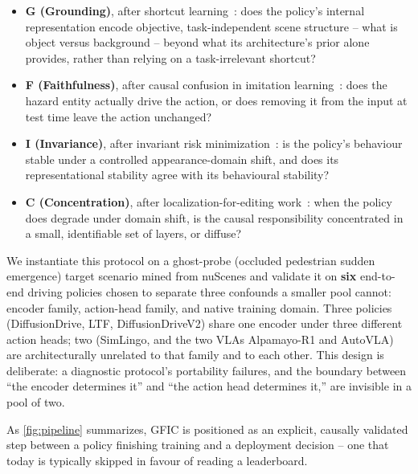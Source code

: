 \begin{itemize}
    \item \textbf{G (Grounding)}, after shortcut learning~\cite{geirhos2020shortcut}: does
    the policy's internal representation encode objective, task-independent scene
    structure -- what is object versus background -- beyond what its architecture's
    prior alone provides, rather than relying on a task-irrelevant shortcut?
    \item \textbf{F (Faithfulness)}, after causal confusion in imitation
    learning~\cite{dehaan2019causal}: does the hazard entity actually drive the action,
    or does removing it from the input at test time leave the action unchanged?
    \item \textbf{I (Invariance)}, after invariant risk minimization~\cite{arjovsky2019irm}:
    is the policy's behaviour stable under a controlled appearance-domain shift, and does
    its representational stability agree with its behavioural stability?
    \item \textbf{C (Concentration)}, after localization-for-editing
    work~\cite{hase2023localization,meng2022rome}: when the policy does degrade under
    domain shift, is the causal responsibility concentrated in a small, identifiable set
    of layers, or diffuse?
\end{itemize}

We instantiate this protocol on a ghost-probe (occluded pedestrian sudden emergence)
target scenario mined from nuScenes and validate it on \textbf{six} end-to-end driving
policies chosen to separate three confounds a smaller pool cannot: encoder family,
action-head family, and native training domain. Three policies (DiffusionDrive, LTF,
DiffusionDriveV2) share one encoder under three different action heads; two (SimLingo,
and the two VLAs Alpamayo-R1 and AutoVLA) are architecturally unrelated to that family and
to each other. This design is deliberate: a diagnostic protocol's portability failures,
and the boundary between ``the encoder determines it'' and ``the action head determines
it,'' are invisible in a pool of two.

As \cref{fig:pipeline} summarizes, GFIC is positioned as an explicit, causally validated
step between a policy finishing training and a deployment decision -- one that today is
typically skipped in favour of reading a leaderboard.

